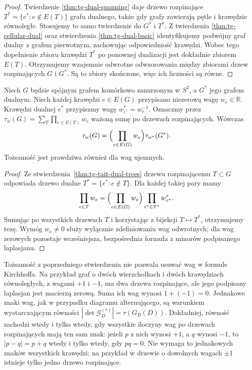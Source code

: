 \begin{proof}
Twierdzenie \ref{thm:tg-dual-spanning} daje drzewo
rozpinające $T^*=\{e^*:e\notin E(T)\}$ grafu dualnego,
także gdy grafy zawierają pętle i krawędzie równoległe.
Stosujemy to samo twierdzenie do $G^*$ i $T^*$.
Z twierdzenia \ref{thm:tg-cellular-dual} oraz stwierdzenia
\ref{thm:tg-dual-basic} identyfikujemy podwójny graf
dualny z grafem pierwotnym, zachowując odpowiedniość
krawędzi. Wobec tego dopełnienie zbioru krawędzi $T^*$
po ponownej dualizacji jest dokładnie zbiorem $E(T)$.
Otrzymujemy wzajemnie odwrotne odwzorowania między
zbiorami drzew rozpinających $G$ i $G^*$.
Są to zbiory skończone, więc ich liczności są równe.
\end{proof}

\begin{wniosek}
\label{cor:tg-tait-weighted-dual}
Niech $G$ będzie spójnym grafem komórkowo zanurzonym
w $S^2$, a $G^*$ jego grafem dualnym.
Niech każdej krawędzi $e\in E(G)$
przypisano niezerową wagę $w_e\in\mathbb R$.
Krawędzi dualnej $e^*$ przypiszmy wagę
$w^*_{e^*}=w_e^{-1}$.
Oznaczmy przez
$\tau_w(G)=\sum_{T}\prod_{e\in E(T)}w_e$
ważoną sumę po drzewach rozpinających.
Wówczas
\[
\tau_w(G)=\Bigl(\prod_{e\in E(G)}w_e\Bigr)
\tau_{w^*}(G^*).
\]
Tożsamość jest prawdziwa również dla wag ujemnych.
\end{wniosek}

\begin{proof}
Ze stwierdzenia~\ref{thm:tg-tait-dual-trees}
drzewu rozpinającemu $T\subset G$
odpowiada drzewo dualne
$T^*=\{e^*:e\notin T\}$.
Dla każdej takiej pary mamy
\[
\prod_{e\in T}w_e
=\Bigl(\prod_{e\in E(G)}w_e\Bigr)
\prod_{e^*\in T^*}w^*_{e^*}.
\]
Sumując po wszystkich drzewach $T$ i korzystając
z bijekcji $T\mapsto T^*$, otrzymujemy tezę.
Wymóg $w_e\ne0$ służy wyłącznie
zdefiniowaniu wag odwrotnych; dla wag zerowych
pozostaje wcześniejsza, bezpośrednia
formuła z minorów podpisanego laplasjanu.
\end{proof}

\begin{uwaga}
Tożsamość z poprzedniego stwierdzenia
nie pozwala usuwać wag w formule
Kirchhoffa. Na przykład graf o dwóch
wierzchołkach i dwóch krawędziach
równoległych, z wagami $+1$ i $-1$,
ma dwa drzewa rozpinające, ale jego
podpisany laplasjan jest macierzą zerową.
Suma ich wag wynosi $1+(-1)=0$.
Jednakowe znaki wag, jak w przypadku diagramu alternującego,
są warunkiem wystarczającym równości
$|\det\mathcal G_D^{(r)}|=\tau(G_B(D))$.
Dokładniej, równość zachodzi wtedy i tylko wtedy, gdy wszystkie
iloczyny wag po drzewach rozpinających mają ten sam znak:
jeżeli $p$ z nich wynosi $+1$, a $q$ wynosi $-1$, to
$|p-q|=p+q$ wtedy i tylko wtedy, gdy $pq=0$.
Nie wymaga to jednakowych znaków wszystkich krawędzi;
na przykład w drzewie o dowolnych wagach $\pm1$ istnieje
tylko jedno drzewo rozpinające.
\end{uwaga}

